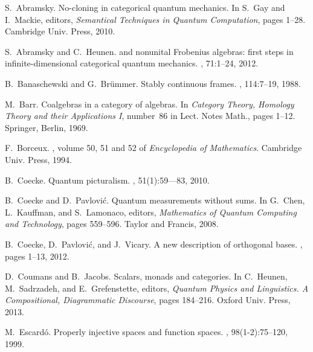\documentclass{LMCS}
\begin{document}
\begin{thebibliography}{10}

S.~Abramsky.
\newblock No-cloning in categorical quantum mechanics.
\newblock In S.~Gay and I.~Mackie, editors, {\em Semantical Techniques in
  Quantum Computation}, pages 1--28. Cambridge Univ. Press, 2010.

S.~Abramsky and C.~Heunen.
 and nonunital {Frobenius} algebras: first steps
  in infinite-dimensional categorical quantum mechanics.
, 71:1--24, 2012.

B.~Banaschewski and G.~Br{\"u}mmer.
\newblock Stably continuous frames.
, 114:7--19, 1988.

M.~Barr.
\newblock Coalgebras in a category of algebras.
\newblock In {\em Category Theory, Homology Theory and their Applications {I}},
  number~86 in Lect. Notes Math., pages 1--12. Springer, Berlin, 1969.

F.~Borceux.
, volume 50, 51 and 52 of {\em
  Encyclopedia of Mathematics}.
\newblock Cambridge Univ. Press, 1994.

B.~Coecke.
\newblock Quantum picturalism.
, 51(1):59–--83, 2010.

B.~Coecke and D.~Pavlovi{\'c}.
\newblock Quantum measurements without sums.
\newblock In G.~Chen, L.~Kauffman, and S.~Lamonaco, editors, {\em Mathematics
  of Quantum Computing and Technology}, pages 559--596. Taylor and Francis,
  2008.

B.~Coecke, D.~Pavlovi{\'c}, and J.~Vicary.
\newblock A new description of orthogonal bases.
, pages 1--13, 2012.

D.~Coumans and B.~Jacobs.
\newblock Scalars, monads and categories.
\newblock In C.~Heunen, M.~Sadrzadeh, and E.~Grefenstette, editors, {\em
  Quantum Physics and Linguistics. A Compositional, Diagrammatic Discourse},
  pages 184--216. Oxford Univ. Press, 2013.

M.~Escard{\'o}.
\newblock Properly injective spaces and function spaces.
, 98(1-2):75--120, 1999.


\end{thebibliography}
\end{document}
